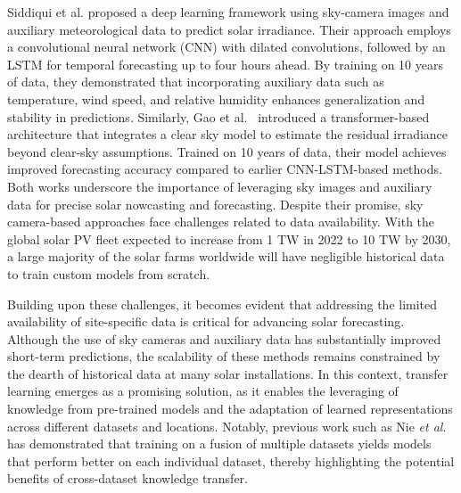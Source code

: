 Siddiqui et al.\cite{talha2019} proposed a deep learning framework using sky-camera images and auxiliary meteorological data to predict solar irradiance. Their approach employs a convolutional neural network (CNN) with dilated convolutions, followed by an LSTM for temporal forecasting up to four hours ahead. By training on 10 years of data, they demonstrated that incorporating auxiliary data such as temperature, wind speed, and relative humidity enhances generalization and stability in predictions. Similarly, Gao et al.~\cite{wacv2022} introduced a transformer-based architecture that integrates a clear sky model to estimate the residual irradiance beyond clear-sky assumptions. Trained on 10 years of data, their model achieves improved forecasting accuracy compared to earlier CNN-LSTM-based methods. Both works underscore the importance of leveraging sky images and auxiliary data for precise solar nowcasting and forecasting. Despite their promise, sky camera-based approaches face challenges related to data availability. With the global solar PV fleet expected to increase from 1 TW in 2022 to 10 TW by 2030, a large majority of the solar farms worldwide will have negligible historical data to train custom models from scratch. 

Building upon these challenges, it becomes evident that addressing the limited availability of site-specific data is critical for advancing solar forecasting. Although the use of sky cameras and auxiliary data has substantially improved short-term predictions, the scalability of these methods remains constrained by the dearth of historical data at many solar installations. In this context, transfer learning emerges as a promising solution, as it enables the leveraging of knowledge from pre-trained models and the adaptation of learned representations across different datasets and locations. Notably, previous work such as Nie \emph{et al}.~\cite{yuhao_transfer_learning} has demonstrated that training on a fusion of multiple datasets yields models that perform better on each individual dataset, thereby highlighting the potential benefits of cross-dataset knowledge transfer.




